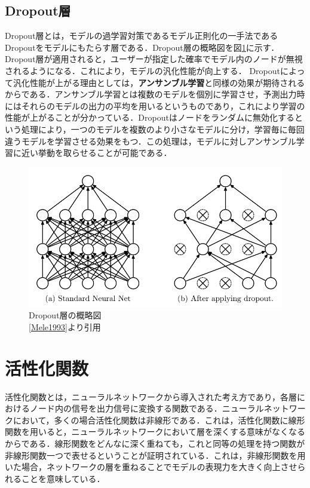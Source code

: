 \documentclass[a4j, 11pt]{jreport}
\begin{document}
\subsection{Dropout層}
Dropout層とは，モデルの過学習対策であるモデル正則化の一手法であるDropoutをモデルにもたらす層である．Dropout層の概略図を図\ref{fig:dropout}に示す．Dropout層が適用されると，ユーザーが指定した確率でモデル内のノードが無視されるようになる．これにより，モデルの汎化性能が向上する．
Dropoutによって汎化性能が上がる理由としては，\textbf{アンサンブル学習}と同様の効果が期待されるからである．アンサンブル学習とは複数のモデルを個別に学習させ，予測出力時にはそれらのモデルの出力の平均を用いるというものであり，これにより学習の性能が上がることが分かっている．Dropoutはノードをランダムに無効化するという処理により，一つのモデルを複数のより小さなモデルに分け，学習毎に毎回違うモデルを学習させる効果をもつ．この処理は，モデルに対しアンサンブル学習に近い挙動を取らせることが可能である．

\begin{figure}[H]
 \centering
 \includegraphics[width=0.8\hsize, keepaspectratio]{images/dropout.png}
 \caption{Dropout層の概略図\\\ref{Mele1993}より引用}
 \label{fig:dropout}
\end{figure}


\section{活性化関数}
活性化関数とは，ニューラルネットワークから導入された考え方であり，各層におけるノード内の信号を出力信号に変換する関数である．ニューラルネットワークにおいて，多くの場合活性化関数は非線形である．これは，活性化関数に線形関数を用いると，ニューラルネットワークにおいて層を深くする意味がなくなるからである．線形関数をどんなに深く重ねても，これと同等の処理を持つ関数が非線形関数一つで表せるということが証明されている．これは，非線形関数を用いた場合，ネットワークの層を重ねることでモデルの表現力を大きく向上させられることを意味している．
\end{document}
